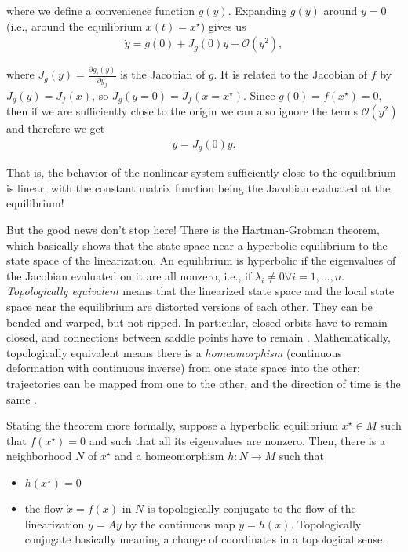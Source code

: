 where we define a convenience function $g(y)$. Expanding $g(y)$ around $y=0$ (i.e., around the equilibrium $x(t) = x^\star$) gives us 
%
\begin{align}
    \dot{y} = g(0) + J_g(0) y + \mathcal{O}(y^2),
\end{align}

where $J_g(y) = \frac{\partial g_i(y)}{\partial y_j}$ is the Jacobian of $g$. It is related to the Jacobian of $f$ by $J_g(y) = J_f(x)$, so $J_g(y=0) = J_f(x=x^\star)$. Since $g(0) = f(x^\star) = 0$, then if we are sufficiently close to the origin we can also ignore the terms $\mathcal{O}(y^2)$ and therefore we get 
%
\begin{align}
    \dot{y} = J_g(0) y.
\end{align}

That is, the behavior of the nonlinear system sufficiently close to the equilibrium is linear, with the constant matrix function being the Jacobian evaluated at the equilibrium! 

But the good news don't stop here! There is the Hartman-Grobman theorem, which basically shows that the state space near a hyperbolic equilibrium to the state space of the linearization. An equilibrium is hyperbolic if the eigenvalues of the Jacobian evaluated on it are all nonzero, i.e., if $\lambda_i \neq 0 \forall i=1,\ldots,n$. \textit{Topologically equivalent} means that the linearized state space and the local state space near the equilibrium are distorted versions of each other. They can be bended and warped, but not ripped. In particular, closed orbits have to remain closed, and connections between saddle points have to remain \cite{strogatz2002nonlinear}. Mathematically, topologically equivalent means there is a \textit{homeomorphism} (continuous deformation with continuous inverse) from one state space into the other; trajectories can be mapped from one to the other, and the direction of time is the same \cite{strogatz2002nonlinear}. 

Stating the theorem more formally, suppose a hyperbolic equilibrium $x^\star \in M$ such that $f(x^\star) = 0$ and such that all its eigenvalues are nonzero. Then, there is a neighborhood $N$ of $x^\star$ and a homeomorphism $h: N\to M$ such that \cite{argyrisbook}
\begin{itemize}
    \item $h(x^\star) = 0$
    \item the flow $\dot{x} = f(x)$ in $N$ is topologically conjugate to the flow of the linearization $\dot{y} = A y$ by the continuous map $y = h(x)$. Topologically conjugate basically meaning a change of coordinates in a topological sense.
\end{itemize}

